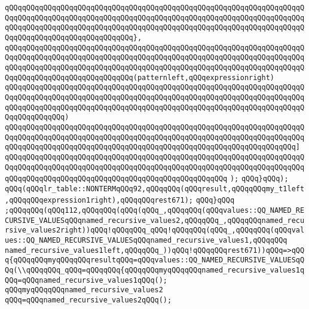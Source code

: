 \verb|qQQqqQQqqQQqqQQqqQQqqQQqqQQqqQQqqQQqqQQqqQQqqQQqqQQqqQQqqQQqqQQqqQQqqQQqqQQqqQQqqQQqqQQqqQQqqQQqqQQqqQQqqQQqqQQqqQQqqQQqqQQqqQQqqQQqqQQqqQQqqQQqqQQqqQQqqQQqqQQqqQQqqQQqqQQqqQQqqQQqqQQqqQQqqQQqqQQqqQQqqQQqqQQqqQQqqQQqqQQqqQQqqQQqqQQqqQQqqQQq},|\newline
\verb|qQQqqQQqqQQqqQQqqQQqqQQqqQQqqQQqqQQqqQQqqQQqqQQqqQQqqQQqqQQqqQQqqQQqqQQqqQQqqQQqqQQqqQQqqQQqqQQqqQQqqQQqqQQqqQQqqQQqqQQqqQQqqQQqqQQqqQQqqQQqqQQqqQQqqQQqqQQqqQQqqQQqqQQqqQQqqQQqqQQqqQQqqQQqqQQqqQQqqQQqqQQqqQQqqQQqqQQqqQQqqQQqqQQqqQQqqQQqqQQq(patternleft,qQQqexpressionright)|\newline
\verb|qQQqqQQqqQQqqQQqqQQqqQQqqQQqqQQqqQQqqQQqqQQqqQQqqQQqqQQqqQQqqQQqqQQqqQQqqQQqqQQqqQQqqQQqqQQqqQQqqQQqqQQqqQQqqQQqqQQqqQQqqQQqqQQqqQQqqQQqqQQqqQQqqQQqqQQqqQQqqQQqqQQqqQQqqQQqqQQqqQQqqQQqqQQqqQQqqQQqqQQqqQQqqQQqqQQqqQQqqQQqqQQq)|\newline
\verb|qQQqqQQqqQQqqQQqqQQqqQQqqQQqqQQqqQQqqQQqqQQqqQQqqQQqqQQqqQQqqQQqqQQqqQQqqQQqqQQqqQQqqQQqqQQqqQQqqQQqqQQqqQQqqQQqqQQqqQQqqQQqqQQqqQQqqQQqqQQqqQQqqQQqqQQqqQQqqQQqqQQqqQQqqQQqqQQqqQQqqQQqqQQqqQQqqQQqqQQqqQQqqQQq]|\newline
\verb|qQQqqQQqqQQqqQQqqQQqqQQqqQQqqQQqqQQqqQQqqQQqqQQqqQQqqQQqqQQqqQQqqQQqqQQqqQQqqQQqqQQqqQQqqQQqqQQqqQQqqQQqqQQqqQQqqQQqqQQqqQQqqQQqqQQqqQQqqQQqqQQqqQQqqQQqqQQqqQQqqQQqqQQqqQQqqQQqqQQqqQQqqQQqqQQq|\newline
\verb|);|\newline
\verb|qQQq}qQQq);|\newline
\verb|qQQq(qQQqlr_table::NONTERMqQQq92,qQQqqQQq(qQQqresult,qQQqqQQqmy_t1left,qQQqqQQqexpression1right),qQQqqQQqrest671);|\newline
\verb|qQQq}qQQq|\newline
\verb|;qQQqqQQq(qQQq112,qQQqqQQq(qQQq(qQQq_,qQQqqQQq(qQQqvalues::QQ_NAMED_RECURSIVE_VALUESqQQqnamed_recursive_values2,qQQqqQQq_,qQQqqQQqnamed_recursive_values2right))qQQq!qQQqqQQq_qQQq!qQQqqQQq(qQQq_,qQQqqQQq(qQQqvalues::QQ_NAMED_RECURSIVE_VALUESqQQqnamed_recursive_values1,qQQqqQQq|\newline
\verb|named_recursive_values1left,qQQqqQQq_))qQQq!qQQqqQQqrest671))qQQq=>qQQq{qQQqqQQqmyqQQqqQQqresultqQQq=qQQqvalues::QQ_NAMED_RECURSIVE_VALUESqQQq(\\qQQqqQQq_qQQq=qQQqqQQq{qQQqqQQqmyqQQqqQQqnamed_recursive_values1qQQq=qQQqnamed_recursive_values1qQQq();|\newline
\verb|qQQqmyqQQqqQQqnamed_recursive_values2|\newline
\verb|qQQq=qQQqnamed_recursive_values2qQQq();|\newline
